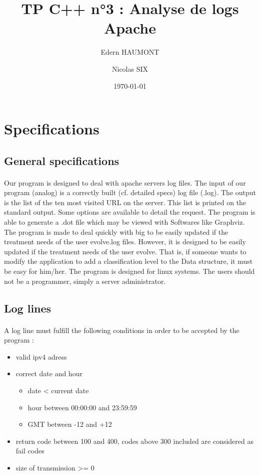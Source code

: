 \documentclass[a4paper, 12pts]{article}
\title{TP C++ n°3 : Analyse de logs Apache}
\author{Edern HAUMONT}
\author{Nicolas SIX}
\affil{B3111}
\date{\today}
\begin{document}

\maketitle



\section{Specifications}
\subsection{General specifications}
\paragraph{}
 Our program is designed to deal with apache servers log files. The input of our program (analog) is a correctly built (cf. detailed specs) log file (.log). The output is the list of the ten most visited URL on the server. This list is printed on the standard output. Some options are available to detail the request. The program is able to generate a .dot file which may be viewed with Softwares like Graphviz.
 The program is made to deal quickly with big to be easily updated if the treatment needs of the user evolve.log files. However, it is designed to be easily updated if the treatment needs of the user evolve. That is, if someone wants to modify the application to add a classification level to the Data structure, it must be easy for him/her.
 The program is designed for linux systems. The users should not be a programmer, simply a server administrator.

\subsection{Log lines}
\paragraph{}
 A log line must fulfill the following conditions in order to be accepted by the program :
 \begin{itemize}[label=$\square$]
 \item valid ipv4 adress
 \item correct date and hour
 \begin{itemize}
 \item date < current date
 \item hour between 00:00:00 and 23:59:59
 \item GMT between -12 and +12
 \end{itemize}
 \item return code between 100 and 400, codes above 300 included are considered as fail codes
 \item size of transmission >= 0
 \end{itemize}
 
\end{document}
